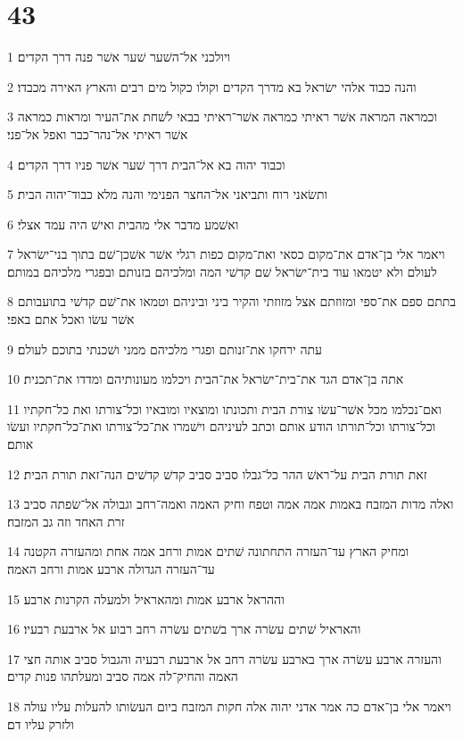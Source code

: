 \chapter{43}

\par 1 ויולכני אל־השׁער שׁער אשׁר פנה דרך הקדים׃
\par 2 והנה כבוד אלהי ישׂראל בא מדרך הקדים וקולו כקול מים רבים והארץ האירה מכבדו׃
\par 3 וכמראה המראה אשׁר ראיתי כמראה אשׁר־ראיתי בבאי לשׁחת את־העיר ומראות כמראה אשׁר ראיתי אל־נהר־כבר ואפל אל־פני׃
\par 4 וכבוד יהוה בא אל־הבית דרך שׁער אשׁר פניו דרך הקדים׃
\par 5 ותשׂאני רוח ותביאני אל־החצר הפנימי והנה מלא כבוד־יהוה הבית׃
\par 6 ואשׁמע מדבר אלי מהבית ואישׁ היה עמד אצלי׃
\par 7 ויאמר אלי בן־אדם את־מקום כסאי ואת־מקום כפות רגלי אשׁר אשׁכן־שׁם בתוך בני־ישׂראל לעולם ולא יטמאו עוד בית־ישׂראל שׁם קדשׁי המה ומלכיהם בזנותם ובפגרי מלכיהם במותם׃
\par 8 בתתם ספם את־ספי ומזוזתם אצל מזוזתי והקיר ביני וביניהם וטמאו את־שׁם קדשׁי בתועבותם אשׁר עשׂו ואכל אתם באפי׃
\par 9 עתה ירחקו את־זנותם ופגרי מלכיהם ממני ושׁכנתי בתוכם לעולם׃
\par 10 אתה בן־אדם הגד את־בית־ישׂראל את־הבית ויכלמו מעונותיהם ומדדו את־תכנית׃
\par 11 ואם־נכלמו מכל אשׁר־עשׂו צורת הבית ותכונתו ומוצאיו ומובאיו וכל־צורתו ואת כל־חקתיו וכל־צורתו וכל־תורתו הודע אותם וכתב לעיניהם וישׁמרו את־כל־צורתו ואת־כל־חקתיו ועשׂו אותם׃
\par 12 זאת תורת הבית על־ראשׁ ההר כל־גבלו סביב סביב קדשׁ קדשׁים הנה־זאת תורת הבית׃
\par 13 ואלה מדות המזבח באמות אמה אמה וטפח וחיק האמה ואמה־רחב וגבולה אל־שׂפתה סביב זרת האחד וזה גב המזבח׃
\par 14 ומחיק הארץ עד־העזרה התחתונה שׁתים אמות ורחב אמה אחת ומהעזרה הקטנה עד־העזרה הגדולה ארבע אמות ורחב האמה׃
\par 15 וההראל ארבע אמות ומהאראיל ולמעלה הקרנות ארבע׃
\par 16 והאראיל שׁתים עשׂרה ארך בשׁתים עשׂרה רחב רבוע אל ארבעת רבעיו׃
\par 17 והעזרה ארבע עשׂרה ארך בארבע עשׂרה רחב אל ארבעת רבעיה והגבול סביב אותה חצי האמה והחיק־לה אמה סביב ומעלתהו פנות קדים׃
\par 18 ויאמר אלי בן־אדם כה אמר אדני יהוה אלה חקות המזבח ביום העשׂותו להעלות עליו עולה ולזרק עליו דם׃
